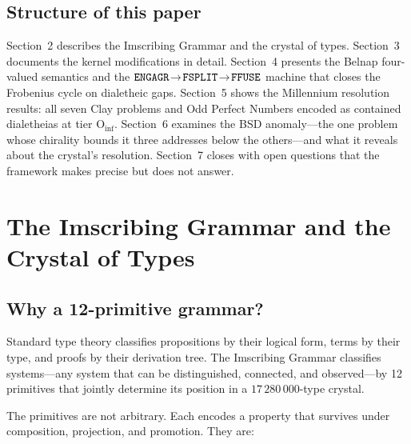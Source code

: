 \documentclass[11pt,a4paper]{article}
\theoremstyle{definition}
\begin{document}
\subsection{Structure of this paper}

Section~2 describes the Imscribing Grammar and the crystal of types.
Section~3 documents the kernel modifications in detail. Section~4 presents the
Belnap four-valued semantics and the ${\tt ENGAGR\!\to\!FSPLIT\!\to\!FFUSE}$
machine that closes the Frobenius cycle on dialetheic gaps. Section~5 shows the
Millennium resolution results: all seven Clay problems and Odd Perfect Numbers
encoded as contained dialetheias at tier $\text{O}_{\text{inf}}$. Section~6
examines the BSD anomaly---the one problem whose chirality bounds it three
addresses below the others---and what it reveals about the crystal's resolution.
Section~7 closes with open questions that the framework makes precise but does
not answer.

\section{The Imscribing Grammar and the Crystal of Types}

\subsection{Why a 12-primitive grammar?}

Standard type theory classifies propositions by their logical form, terms by
their type, and proofs by their derivation tree. The Imscribing Grammar
classifies systems---any system that can be distinguished, connected, and
observed---by 12 primitives that jointly determine its position
in a $17\,280\,000$-type crystal.

The primitives are not arbitrary. Each encodes a property that
survives under composition, projection, and promotion. They are:
\end{document}
